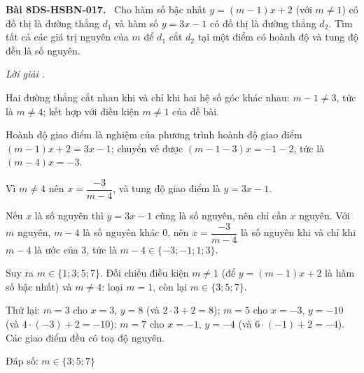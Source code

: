 \documentclass[12pt,a4paper]{article}
\newenvironment{problem}[1][]{\par\medskip\noindent\textbf{Bài #1.}\ }{\par}
\newenvironment{solution}[1][]{\par\noindent\textit{Lời giải #1.}\par}{\par}
\begin{document}
\begin{problem}[8DS-HSBN-017]
Cho hàm số bậc nhất $y = (m - 1)x + 2$ (với $m \neq 1$) có đồ thị là đường thẳng $d_1$ và hàm số $y = 3x - 1$ có đồ thị là đường thẳng $d_2$. Tìm tất cả các giá trị nguyên của $m$ để $d_1$ cắt $d_2$ tại một điểm có hoành độ và tung độ đều là số nguyên.

\begin{solution}
Hai đường thẳng cắt nhau khi và chỉ khi hai hệ số góc khác nhau: $m - 1 \neq 3$, tức là $m \neq 4$; kết hợp với điều kiện $m \neq 1$ của đề bài.

Hoành độ giao điểm là nghiệm của phương trình hoành độ giao điểm $(m - 1)x + 2 = 3x - 1$; chuyển vế được $(m - 1 - 3)x = -1 - 2$, tức là $(m - 4)x = -3$.

Vì $m \neq 4$ nên $x = \dfrac{-3}{m - 4}$, và tung độ giao điểm là $y = 3x - 1$.

Nếu $x$ là số nguyên thì $y = 3x - 1$ cũng là số nguyên, nên chỉ cần $x$ nguyên. Với $m$ nguyên, $m - 4$ là số nguyên khác $0$, nên $x = \dfrac{-3}{m - 4}$ là số nguyên khi và chỉ khi $m - 4$ là ước của $3$, tức là $m - 4 \in \{-3; -1; 1; 3\}$.

Suy ra $m \in \{1; 3; 5; 7\}$. Đối chiếu điều kiện $m \neq 1$ (để $y = (m - 1)x + 2$ là hàm số bậc nhất) và $m \neq 4$: loại $m = 1$, còn lại $m \in \{3; 5; 7\}$.

Thử lại: $m = 3$ cho $x = 3$, $y = 8$ (và $2 \cdot 3 + 2 = 8$); $m = 5$ cho $x = -3$, $y = -10$ (và $4 \cdot (-3) + 2 = -10$); $m = 7$ cho $x = -1$, $y = -4$ (và $6 \cdot (-1) + 2 = -4$). Các giao điểm đều có toạ độ nguyên.

Đáp số: $\boxed{m \in \{3; 5; 7\}}$
\end{solution}
\end{problem}
\end{document}
